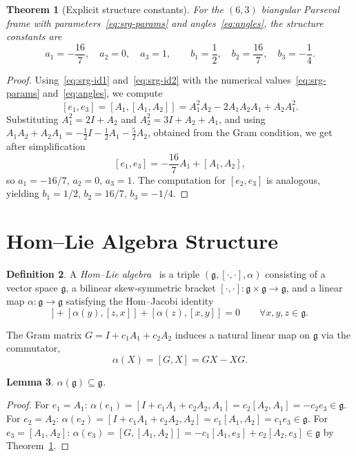 \documentclass[a4paper]{amsart}
\theoremstyle{plain}
\newtheorem{theorem}{Theorem}[section]
\newtheorem{lemma}[theorem]{Lemma}
\theoremstyle{definition}
\newtheorem{definition}[theorem]{Definition}
\theoremstyle{remark}
\newcommand{\g}{\mathfrak{g}}
\begin{document}
	\begin{theorem}[Explicit structure constants]\label{thm:structure}
		For the $(6,3)$ biangular Parseval frame with parameters~\eqref{eq:srg-params} and angles~\eqref{eq:angles}, the structure constants are
		\[
		a_1 = -\frac{16}{7}, \quad a_2 = 0, \quad a_3 = 1, \qquad
		b_1 = \frac{1}{2}, \quad b_2 = \frac{16}{7}, \quad b_3 = -\frac{1}{4}.
		\]
	\end{theorem}
	\begin{proof} Using~\eqref{eq:srg-id1} and~\eqref{eq:srg-id2} with the numerical values~\eqref{eq:srg-params} and~\eqref{eq:angles}, we compute
		\[
		[e_1,e_3] = [A_1, [A_1,A_2]] = A_1^2A_2 - 2A_1A_2A_1 + A_2A_1^2.
		\]
		Substituting $A_1^2 = 2I + A_2$ and $A_2^2 = 3I + A_2 + A_1$, and using $A_1A_2 + A_2A_1 = -\frac{1}{2}I - \frac{1}{2}A_1 - \frac{5}{2}A_2$, obtained from the Gram condition, we get after simplification
		\[
		[e_1,e_3] = -\frac{16}{7}A_1 + [A_1,A_2],
		\]
		so $a_1 = -16/7$, $a_2 = 0$, $a_3 = 1$. The computation for $[e_2,e_3]$ is analogous, yielding $b_1 = 1/2$, $b_2 = 16/7$, $b_3 = -1/4$.
	\end{proof}
	
	\section{Hom--Lie Algebra Structure}
	\label{sec:hom-lie}
	
	\begin{definition}
		A {\em Hom--Lie algebra}~\cite{Hom,Back2022} is a triple $(\g, [\cdot,\cdot], \alpha)$ consisting of a vector space $\g$, a bilinear skew-symmetric bracket $[\cdot,\cdot]\colon \g\times\g \to \g$, and a linear map $\alpha\colon\g\to\g$ satisfying the Hom--Jacobi identity
		\begin{equation}
			[\alpha(x), [y,z]] + [\alpha(y), [z,x]] + [\alpha(z), [x,y]] = 0 \qquad \forall x,y,z\in\g. \label{eq:hom-jacobi}
		\end{equation}
	\end{definition}
	The Gram matrix $G = I + c_1 A_1 + c_2 A_2$ induces a natural linear map on $\g$ via the commutator,
	\[
	\alpha(X) = [G, X] = GX - XG.
	\]
	
	\begin{lemma} $\alpha(\g) \subseteq \g$.
	\end{lemma}
	\begin{proof} For $e_1 = A_1$: $\alpha(e_1) = [I + c_1 A_1 + c_2 A_2, A_1] = c_2[A_2, A_1] = -c_2 e_3 \in \g$.
		For $e_2 = A_2$: $\alpha(e_2) = [I + c_1 A_1 + c_2 A_2, A_2] = c_1[A_1, A_2] = c_1 e_3 \in \g$.
		For $e_3 = [A_1,A_2]$: $\alpha(e_3) = [G, [A_1,A_2]] = -c_1[A_1,e_3] + c_2[A_2,e_3] \in \g$ by Theorem~\ref{thm:structure}.
	\end{proof}
	
\end{document}
